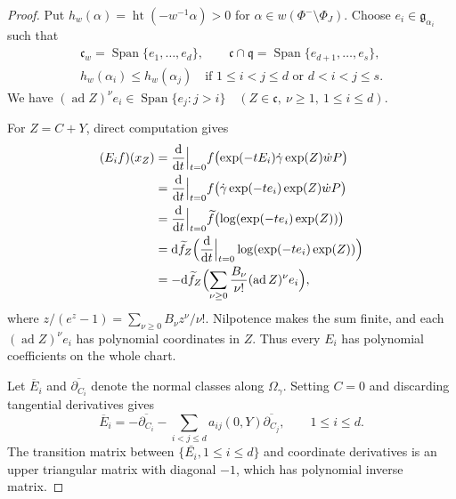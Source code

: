 \documentclass[a4paper,12pt]{amsart}
\numberwithin{equation}{section}
\theoremstyle{definition}
\theoremstyle{remark}
\newcommand{\fg}{\mathfrak g}
\newcommand{\fq}{\mathfrak q}
\newcommand{\fc}{\mathfrak c}
\newcommand{\dd}{\mathrm d}
\newcommand{\Span}{\operatorname{Span}}
\newcommand{\ad}{\operatorname{ad}}
\newcommand{\Ht}{\operatorname{ht}}
\begin{document}
\begin{proof}
Put $h_w(\alpha)=\Ht(-w^{-1}\alpha)>0$ for $\alpha\in w(\Phi^-\setminus\Phi_J)$. Choose $e_i\in\fg_{\alpha_i}$ such that
\[
\begin{gathered}
 \fc_w=\Span\{e_1,\dots,e_d\},\qquad
 \fc\cap\fq=\Span\{e_{d+1},\dots,e_s\},\\
 h_w(\alpha_i)\le h_w(\alpha_j)
 \quad\text{if }1\le i<j\le d\text{ or }d<i<j\le s.
\end{gathered}
\]
We have $(\ad Z)^\nu e_i\in\Span\{e_j:j>i\}
 \quad(Z\in\fc,\ \nu\ge1,\ 1\le i\le d)$.

For $Z=C+Y$, direct computation gives
\begin{equation}\label{eq:BCH}
\begin{aligned}
 (E_if)(x_Z)
 &=\frac{\dd}{\dd t}\Big|_{t=0}
 f\bigl(\exp(-tE_i)\dot\gamma\exp(Z)\dot wP\bigr)\\
  &=\frac{\dd}{\dd t}\Big|_{t=0}
 f\bigl(\dot\gamma\exp(-te_i)\exp(Z)\dot wP\bigr)\\
 &=\frac{\dd}{\dd t}\Big|_{t=0}
 \widetilde f\bigl(\log(\exp(-te_i)\exp(Z))\bigr)\\
  &=\dd\widetilde f_Z\Bigl(
 \frac{\dd}{\dd t}\Big|_{t=0}\log(\exp(-te_i)\exp(Z))\Bigr)\\
 &=-\dd\widetilde f_Z\Bigl(
 \sum_{\nu\ge0}\frac{B_\nu}{\nu!}(\ad Z)^\nu e_i\Bigr),
\end{aligned}
\end{equation}
where $z/(e^z-1)=\sum_{\nu\ge0}B_\nu z^\nu/\nu!$. Nilpotence makes the sum finite, and each $(\ad Z)^\nu e_i$ has polynomial coordinates in $Z$. Thus every $E_i$ has polynomial coefficients on the whole chart.

Let $\overline E_i$ and $\overline{\partial_{C_i}}$ denote the normal classes along $\Omega_\gamma$. Setting $C=0$ and discarding tangential derivatives gives
\[
 \overline E_i=-\overline{\partial_{C_i}}
 -\sum_{i<j\le d}a_{ij}(0,Y)\overline{\partial_{C_j}},
 \qquad 1\le i\le d.
\]
The transition matrix between $\{\bar{E_i},1\leq i\leq d\}$ and coordinate derivatives is an upper triangular matrix with diagonal $-1$, which has polynomial inverse matrix.
\end{proof}
\end{document}

